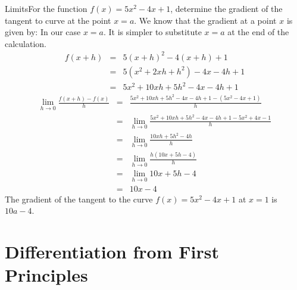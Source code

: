 \begin{wex}
{Limits}{For the function $f(x)=5x^2-4x+1$, determine the gradient of the tangent to curve at the point $x=a$.}{
We know that the gradient at a point $x$ is given by:
In our case $x=a$. It is simpler to substitute $x=a$ at the end of the calculation.
\begin{eqnarray*}
f(x+h)&=&5(x+h)^2-4(x+h)+1\\
&=&5(x^2+2xh+h^2)-4x-4h+1\\
&=&5x^2+10xh+5h^2-4x-4h+1
\end{eqnarray*}
\begin{eqnarray*}
\lim_{h \to 0}\frac{f(x+h)-f(x)}{h}&=&\frac{5x^2+10xh+5h^2-4x-4h+1 - (5x^2-4x+1)}{h}\\
&=&\lim_{h \to 0}\frac{5x^2+10xh+5h^2-4x-4h+1 - 5x^2+4x-1}{h}\\
&=&\lim_{h \to 0}\frac{10xh+5h^2-4h}{h}\\
&=&\lim_{h \to 0}\frac{h(10x+5h-4)}{h}\\
&=&\lim_{h \to 0}10x+5h-4\\
&=&10x-4
\end{eqnarray*}
The gradient of the tangent to the curve $f(x)=5x^2-4x+1$ at $x=1$ is $10a-4$.
}
\end{wex}



\section{Differentiation from First Principles}
\label{md:derivatives}

